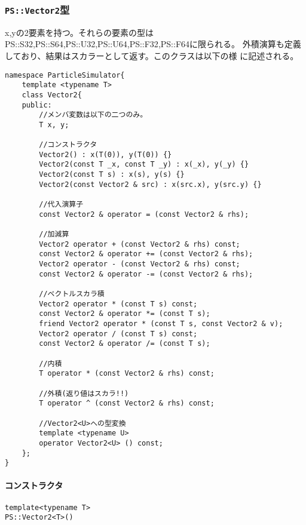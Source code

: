 \subsubsection{{\tt PS::Vector2}型} 

x,yの2要素を持つ。それらの要素の型は
{PS::S32},{PS::S64},{PS::U32},{PS::U64},{PS::F32},{PS::F64}に限られる。
外積演算も定義しており、結果はスカラーとして返す。このクラスは以下の様
に記述される。

\begin{lstlisting}[caption=Vector2]
namespace ParticleSimulator{
    template <typename T>
    class Vector2{
    public:
        //メンバ変数は以下の二つのみ。
        T x, y;

        //コンストラクタ
        Vector2() : x(T(0)), y(T(0)) {}
        Vector2(const T _x, const T _y) : x(_x), y(_y) {}
        Vector2(const T s) : x(s), y(s) {}
        Vector2(const Vector2 & src) : x(src.x), y(src.y) {}

        //代入演算子
        const Vector2 & operator = (const Vector2 & rhs);

        //加減算
        Vector2 operator + (const Vector2 & rhs) const;
        const Vector2 & operator += (const Vector2 & rhs);
        Vector2 operator - (const Vector2 & rhs) const;
        const Vector2 & operator -= (const Vector2 & rhs);

        //ベクトルスカラ積
        Vector2 operator * (const T s) const;
        const Vector2 & operator *= (const T s);
        friend Vector2 operator * (const T s, const Vector2 & v);
        Vector2 operator / (const T s) const;
        const Vector2 & operator /= (const T s);

        //内積
        T operator * (const Vector2 & rhs) const;

        //外積(返り値はスカラ!!)
        T operator ^ (const Vector2 & rhs) const;

        //Vector2<U>への型変換
        template <typename U>
        operator Vector2<U> () const;
    };
}
\end{lstlisting}
\paragraph{コンストラクタ}
\mbox{}
\begin{screen}
\begin{verbatim}
template<typename T>
PS::Vector2<T>()
\end{verbatim}
\end{screen}

